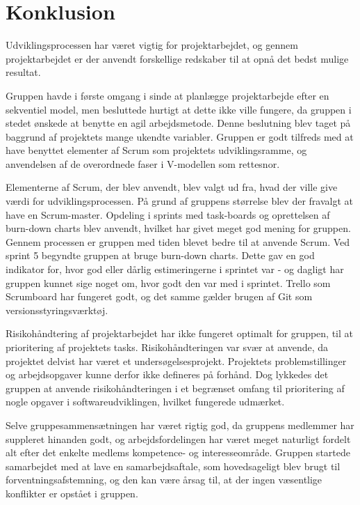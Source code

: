 \chapter{Konklusion}\label{Konklusion}
Udviklingsprocessen har været vigtig for projektarbejdet, og gennem projektarbejdet er der anvendt forskellige redskaber til at opnå det bedst mulige resultat. 

Gruppen havde i første omgang i sinde at planlægge projektarbejde efter en sekventiel model, men besluttede hurtigt at dette ikke ville fungere, da gruppen i stedet ønskede at benytte en agil arbejdsmetode. Denne beslutning blev taget på baggrund af projektets mange ukendte variabler. Gruppen er godt tilfreds med at have benyttet elementer af Scrum som projektets udviklingsramme, og anvendelsen af de overordnede faser i V-modellen som rettesnor.

Elementerne af Scrum, der blev anvendt, blev valgt ud fra, hvad der ville give værdi for udviklingsprocessen. På grund af gruppens størrelse blev der fravalgt at have en Scrum-master. Opdeling i sprints med task-boards og oprettelsen af burn-down charts blev anvendt, hvilket har givet meget god mening for gruppen. Gennem processen er gruppen med tiden blevet bedre til at anvende Scrum. Ved sprint 5 begyndte gruppen at bruge burn-down charts. Dette gav en god indikator for, hvor god eller dårlig estimeringerne i sprintet var - og dagligt har gruppen kunnet sige noget om, hvor godt den var med i sprintet. Trello som Scrumboard har fungeret godt, og det samme gælder brugen af Git som versionsstyringsværktøj.

Risikohåndtering af projektarbejdet har ikke fungeret optimalt for gruppen, til at prioritering af projektets tasks. Risikohåndteringen var svær at anvende, da projektet delvist har været et undersøgelsesprojekt. Projektets problemstillinger og arbejdsopgaver kunne derfor ikke defineres på forhånd. Dog lykkedes det gruppen at anvende risikohåndteringen i et begrænset omfang til prioritering af nogle opgaver i softwareudviklingen, hvilket fungerede udmærket. 

Selve gruppesammensætningen har været rigtig god, da gruppens medlemmer har suppleret hinanden godt, og arbejdsfordelingen har været meget naturligt fordelt alt efter det enkelte medlems kompetence- og interesseområde. Gruppen startede samarbejdet med at lave en samarbejdsaftale, som hovedsageligt blev brugt til forventningsafstemning, og den kan være årsag til, at der ingen væsentlige konflikter er opstået i gruppen. 
